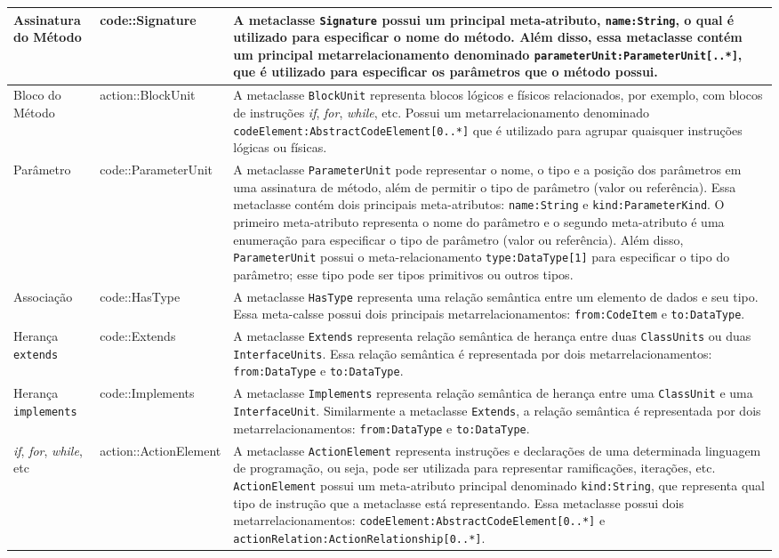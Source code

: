 \begin{longtable}[c]{| m{1.9cm} | m{3.57cm}| m{9.3cm} |}
\hline
Assinatura do Método & code::Signature & A metaclasse \texttt{Signature} possui um principal meta-atributo, \texttt{name:String}, o qual é utilizado para especificar o nome do método. Além disso, essa metaclasse contém um principal metarrelacionamento denominado \texttt{parameterUnit:ParameterUnit[..*]}, que é utilizado para especificar os parâmetros que o método possui.\\ 
\hline
Bloco do Método & action::BlockUnit & A metaclasse \texttt{BlockUnit} representa blocos lógicos e físicos relacionados, por exemplo, com blocos de instruções \textit{if}, \textit{for}, \textit{while}, etc. Possui um metarrelacionamento denominado \texttt{codeElement:AbstractCodeElement[0..*]} que é utilizado para agrupar quaisquer instruções lógicas ou físicas.\\ 
\hline
Parâmetro & code::ParameterUnit & A metaclasse \texttt{ParameterUnit} pode representar o nome, o tipo e a posição dos parâmetros em uma assinatura de método, além de permitir o tipo de parâmetro (valor ou referência). Essa metaclasse contém dois principais meta-atributos: \texttt{name:String} e \texttt{kind:ParameterKind}. O primeiro meta-atributo representa o nome do parâmetro e o segundo meta-atributo é uma enumeração para especificar o tipo de parâmetro (valor ou referência). Além disso, \texttt{ParameterUnit} possui o meta-relacionamento \texttt{type:DataType[1]} para especificar o tipo do parâmetro; esse tipo pode ser tipos primitivos ou outros tipos.\\ 
\hline
Associação & code::HasType & A metaclasse \texttt{HasType} representa uma relação semântica entre um elemento de dados e seu tipo. Essa meta-calsse possui dois principais metarrelacionamentos: \texttt{from:CodeItem} e \texttt{to:DataType}.\\ 
\hline
Herança \texttt{extends} & code::Extends & A metaclasse \texttt{Extends} representa relação semântica de herança entre duas \texttt{ClassUnits} ou duas \texttt{InterfaceUnits}. Essa relação semântica é representada por dois metarrelacionamentos: \texttt{from:DataType} e \texttt{to:DataType}.\\ 
\hline
Herança \texttt{implements} & code::Implements & A metaclasse \texttt{Implements} representa relação semântica de herança entre uma \texttt{ClassUnit} e uma \texttt{InterfaceUnit}. Similarmente a metaclasse \texttt{Extends}, a relação semântica é representada por dois metarrelacionamentos: \texttt{from:DataType} e \texttt{to:DataType}.\\ 
\hline
\textit{if}, \textit{for}, \textit{while}, etc & action::ActionElement & A metaclasse \texttt{ActionElement} representa instruções e declarações de uma determinada linguagem de programação, ou seja, pode ser utilizada para representar ramificações, iterações, etc. \texttt{ActionElement} possui um meta-atributo principal denominado \texttt{kind:String}, que representa qual tipo de instrução que a metaclasse está representando. Essa metaclasse possui dois metarrelacionamentos: \texttt{codeElement:AbstractCodeElement[0..*]} e \texttt{actionRelation:ActionRelationship[0..*]}.\\ 
\hline
 \end{longtable}
